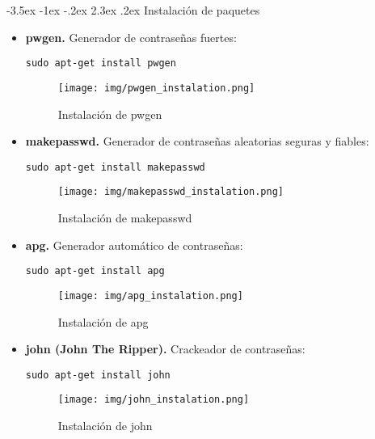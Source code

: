 \documentclass[11pt]{report}
\makeatletter
\renewcommand\chapter{\@startsection{chapter}{0}{\z@}%
    {-3.5ex \@plus -1ex \@minus -.2ex}%
    {2.3ex \@plus.2ex}%
    {\normalfont\Large\bfseries}}
\makeatother
\begin{document}
\chapter{Instalación de paquetes}
\begin{itemize}
  \item \textbf{pwgen.} Generador de contraseñas fuertes:
  \begin{BVerbatim}
sudo apt-get install pwgen
  \end{BVerbatim}
  \begin{figure}[H]
    \centering
    \texttt{[image: img/pwgen\_instalation.png]}
    \caption{Instalación de pwgen}
    \label{fig:instalación de pwgen}    
  \end{figure}

  \item \textbf{makepasswd.} Generador de contraseñas aleatorias seguras y fiables:
  \begin{BVerbatim}
sudo apt-get install makepasswd
  \end{BVerbatim}
  \begin{figure}[H]
    \centering
    \texttt{[image: img/makepasswd\_instalation.png]}
    \caption{Instalación de makepasswd}
    \label{fig:instalación de makepasswd}
  \end{figure}

  \item \textbf{apg.} Generador automático de contraseñas:
  \begin{BVerbatim}
sudo apt-get install apg
  \end{BVerbatim}
  \begin{figure}[H]
    \centering
    \texttt{[image: img/apg\_instalation.png]}
    \caption{Instalación de apg}
    \label{fig:instalación de apg}
  \end{figure}


  \item \textbf{john (John The Ripper).} Crackeador de contraseñas:
  \begin{BVerbatim}
sudo apt-get install john
  \end{BVerbatim}
  \begin{figure}[H]
    \centering
    \texttt{[image: img/john\_instalation.png]}
    \caption{Instalación de john}
    \label{fig:instalación de john}
  \end{figure}


\end{itemize}
\end{document}
